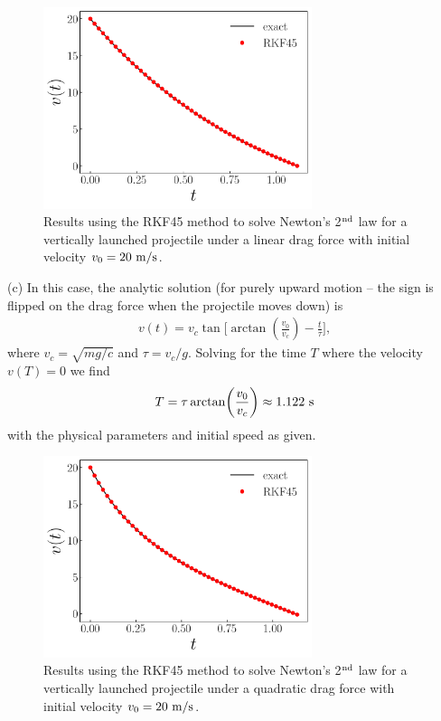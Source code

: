 {\begin{figure}[h!tb]
    \centering
    \includegraphics[width=0.7\textwidth]{prob4b.pdf}
    \caption{Results using the RKF45 method to solve Newton's 2$^{\rm nd}$ law for a vertically launched projectile under a linear drag force with initial velocity $v_0 = 20~{\rm m/s}$.}
    \label{fig:prob4b}
\end{figure}


(c) In this case, the analytic solution (for purely upward motion -- the sign is flipped on the drag force when the projectile moves down) is
\begin{align}
    v(t) = v_{c} \tan\Bigg[ \arctan(\frac{v_0}{v_{c}})  - \frac{t}{\tau} \Bigg]
,\end{align}
where $v_{c} = \sqrt{m g / c}$ and $\tau = v_{c} / g$.
Solving for the time $T$ where the velocity $v(T) = 0$ we find
\begin{align}
    T = \tau \arctan(\frac{v_0}{v_{c}}) \approx 1.122~{\rm s}
\end{align}
with the physical parameters and initial speed as given.


\begin{figure}[h!tb]
    \centering
    \includegraphics[width=0.7\textwidth]{prob4c.pdf}
    \caption{Results using the RKF45 method to solve Newton's 2$^{\rm nd}$ law for a vertically launched projectile under a quadratic drag force with initial velocity $v_0 = 20~{\rm m/s}$.}
    \label{fig:prob4c}
\end{figure}

}

    

